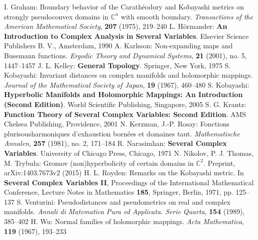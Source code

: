 \begin{thebibliography}{widest entry}
   I. Graham: Boundary behavior of the Carathéodory and Kobayashi metrics on strongly pseudoconvex domains in $\mathbb{C}^n$ with smooth boundary. \textit{Transactions of the American Mathematical Society}, \textbf{207} (1975), 219--240
   L. Hörmander: \textbf{An Introduction to Complex Analysis in Several Variables}. Elsevier Science Publishers B. V., Amsterdam, 1990
   A. Karlsson: Non-expanding maps and Busemann functions. \textit{Ergodic Theory and Dynamical Systems}, \textbf{21} (2001), no. 5, 1447--1457
   J. L. Kelley: \textbf{General Topology}. Springer, New York, 1975
   S. Kobayashi: Invariant distances on complex manifolds and holomorphic mappings. \textit{Journal of the Mathematical Society of Japan}, \textbf{19} (1967), 460--480
   S. Kobayashi: \textbf{Hyperbolic Manifolds and Holomorphic Mappings: An Introduction (Second Edition)}. World Scientific Publishing, Singapore, 2005
   S. G. Krantz: \textbf{Function Theory of Several Complex Variables: Second Edition}. AMS Chelsea Publishing, Providence, 2001
   N. Kerzman, J.-P. Rosay: Fonctions plurisousharmoniques d'exhaustion bornées et domaines taut. \textit{Mathematische Annalen}, \textbf{257} (1981), no. 2, 171--184
   R. Narasimhan: \textbf{Several Complex Variables}. University of Chicago Press, Chicago, 1971
   N. Nikolov, P. J. Thomas, M. Trybuła: Gromov (non)hyperbolicity of certain domains in $\mathbb{C}^2$. Preprint, arXiv:1403.7673v2 (2015)
   H. L. Royden: Remarks on the Kobayashi metric. In \textbf{Several Complex Variables II}, Proceedings of the International Mathematical Conference, Lecture Notes in Mathematics \textbf{185}, Springer, Berlin, 1971, pp. 125--137
   S. Venturini: Pseudodistances and pseudometrics on real and complex manifolds. \textit{Annali di Matematica Pura ed Applicata. Serie Quarta}, \textbf{154} (1989), 385--402
   H. Wu: Normal families of holomorphic mappings. \textit{Acta Mathematica}, \textbf{119} (1967), 193--233
\end{thebibliography}
